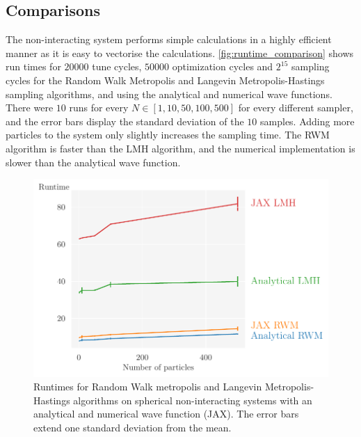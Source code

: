\FloatBarrier

\subsection{Comparisons}


The non-interacting system performs simple calculations in a highly efficient manner as it is easy to vectorise the calculations. \autoref{fig:runtime_comparison} shows run times for $20000$ tune cycles, $50000$ optimization cycles and $2^{15}$ sampling cycles for the Random Walk Metropolis and Langevin Metropolis-Hastings sampling algorithms, and using the analytical and numerical wave functions. There were $10$ runs for every $N\in[1, 10, 50, 100, 500]$ for every different sampler, and the error bars display the standard deviation of the $10$ samples. Adding more particles to the system only slightly increases the sampling time. The RWM algorithm is faster than the LMH algorithm, and the numerical implementation is slower than the analytical wave function. 

\begin{figure}[!htb]
\begin{center}\includegraphics[width=\textwidth]{latex/figures/runtime_comparisons.pdf}
\end{center}
\caption{Runtimes for Random Walk metropolis and Langevin Metropolis-Hastings algorithms on spherical non-interacting systems with an analytical and numerical wave function (JAX). The error bars extend one standard deviation from the mean.}
\label{fig:runtime_comparison}
\end{figure}

